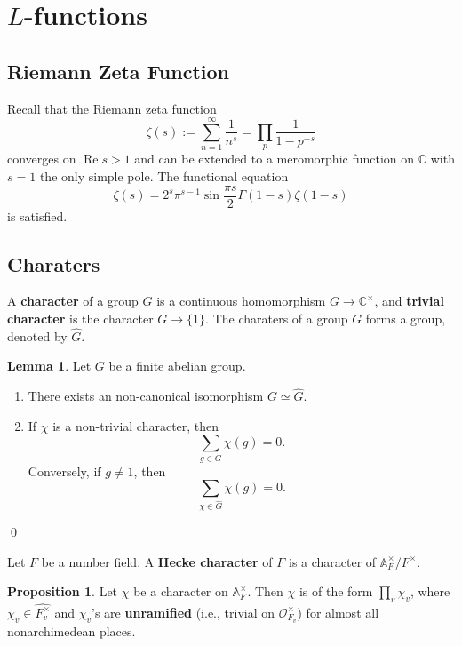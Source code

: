 \documentclass{article}
\theoremstyle{definition}
\newtheorem{proposition}{Proposition}[section]
\newtheorem{lemma}{Lemma}[section]
\theoremstyle{remark}
\renewcommand{\Re}{\mathop{\mathrm{Re}}}
\renewcommand{\hat}{\widehat}
\newcommand{\C}{\mathbb{C}}
\newcommand{\idele}[1]{\mathbb{A}_{#1}^{\times}}
\begin{document}
\section{$L$-functions}

\subsection{Riemann Zeta Function}
Recall that the Riemann zeta function \[\zeta(s):=\sum_{n=1}^\infty\frac{1}{n^s}=\prod_p\frac{1}{1-p^{-s}}\]
converges on $\Re s>1$ and can be extended to a meromorphic function on $\C$ with $s=1$ the only simple pole.
The functional equation \[\zeta(s)=2^s\pi^{s-1}\sin\frac{\pi s}{2}\Gamma(1-s)\zeta(1-s)\] is satisfied.

\subsection{Charaters}
A \textbf{character} of a group $G$ is a continuous homomorphism $G\to\C^{\times}$, and \textbf{trivial character} is the character $G \to \{1\}$.
The charaters of a group $G$ forms a group, denoted by $\hat{G}$.
\begin{lemma}
    Let $G$ be a finite abelian group. 
    \begin{enumerate}
        \item There exists an non-canonical isomorphism $G \simeq \hat{G}$.
        \item If $\chi$ is a non-trivial character, then \[\sum_{g\in G} \chi(g) = 0.\]
        Conversely, if $g\neq 1$, then \[\sum_{\chi\in\hat{G}} \chi(g) = 0.\]
    \end{enumerate}\qed
\end{lemma}

Let $F$ be a number field. A \textbf{Hecke character} of $F$ is a character of $\idele{F}/F^{\times}$.
\begin{proposition}
    Let $\chi$ be a character on $\idele{F}$. Then $\chi$ is of the form $\prod_v\chi_v$, where $\chi_v\in \hat{F_v^\times}$ and $\chi_v$'s are \textbf{unramified} (i.e., trivial on $\mathcal{O}_{F_v}^\times$) for almost all nonarchimedean places.
\end{proposition}
\end{document}
